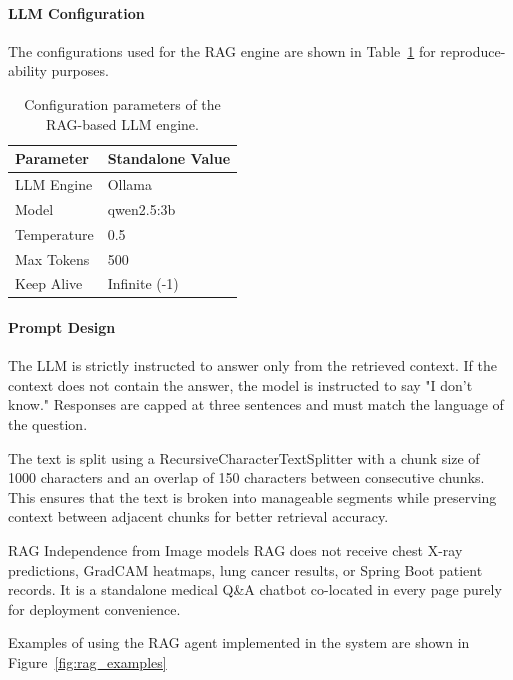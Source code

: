 \paragraph{LLM Configuration}
The configurations used for the RAG engine are shown in Table~\ref{tab:llm_parameters} for reproduce-ability purposes.
\begin{table}[htbp]
	\centering
	\caption{Configuration parameters of the RAG-based LLM engine.}
	\label{tab:llm_parameters}
	\begin{tabular}{|p{5cm}|p{8cm}|}
		\hline
		\textbf{Parameter} & \textbf{Standalone Value} \\
		\hline
		
		LLM Engine &
		Ollama \\
		\hline
		
		Model &
		qwen2.5:3b \\
		\hline
		
		Temperature &
		0.5 \\
		\hline
		
		Max Tokens &
		500 \\
		\hline
		
		Keep Alive &
		Infinite (-1) \\
		\hline
		
	\end{tabular}
\end{table}

\paragraph{Prompt Design}
The LLM is strictly instructed to answer only from the retrieved context. If the context does not contain the answer, the model is instructed to say "I don't know." Responses are capped at three sentences and must match the language of the question.

The text is split using a RecursiveCharacterTextSplitter with a chunk size of 1000 characters and an overlap of 150 characters between consecutive chunks. This ensures that the text is broken into manageable segments while preserving context between adjacent chunks for better retrieval accuracy.

RAG Independence from Image models  RAG does not receive chest X-ray predictions, GradCAM heatmaps, lung cancer results, or Spring Boot patient records. It is a standalone medical Q\&A chatbot co-located in every page  purely for deployment convenience.

Examples of using the RAG agent implemented in the system are shown in Figure~\ref{fig:rag_examples}

